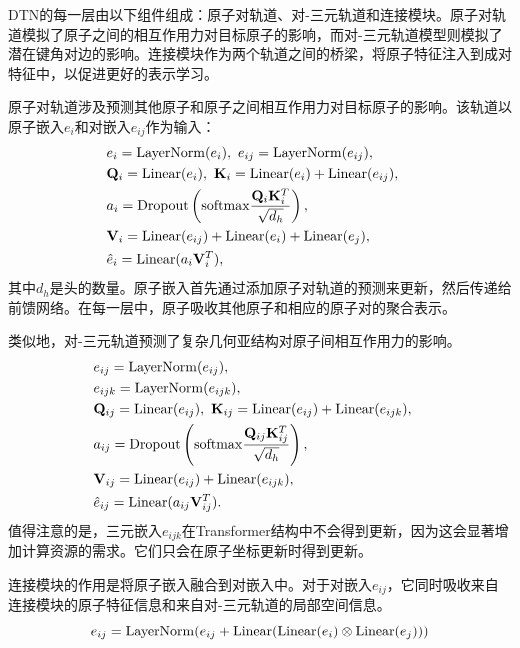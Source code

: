 DTN的每一层由以下组件组成：原子对轨道、对-三元轨道和连接模块。原子对轨道模拟了原子之间的相互作用力对目标原子的影响，而对-三元轨道模型则模拟了潜在键角对边的影响。连接模块作为两个轨道之间的桥梁，将原子特征注入到成对特征中，以促进更好的表示学习。

原子对轨道涉及预测其他原子和原子之间相互作用力对目标原子的影响。该轨道以原子嵌入$e_i$和对嵌入$e_{ij}$作为输入：
\begin{eqnarray}
    &e_i = {\rm LayerNorm}(e_i), \ e_{ij} = {\rm LayerNorm}(e_{ij}),& \\
    &\mathbf{Q}_i = {\rm Linear}(e_i), \ \mathbf{K}_i = {\rm Linear}(e_i) + {\rm Linear}(e_{ij}),& \\
    &a_i = {\rm Dropout} \left({\rm softmax} \frac{\mathbf{Q}_i \mathbf{K}_i^T}{\sqrt{d_h}} \right), & \\
    &\mathbf{V}_i = {\rm Linear}(e_{ij}) + {\rm Linear}(e_{i}) + {\rm Linear}(e_{j}),& \\
    &\hat{e}_i = {\rm Linear}(a_i \mathbf{V}_i^T),&
\end{eqnarray}
其中$d_h$是头的数量。原子嵌入首先通过添加原子对轨道的预测来更新，然后传递给前馈网络。在每一层中，原子吸收其他原子和相应的原子对的聚合表示。

类似地，对-三元轨道预测了复杂几何亚结构对原子间相互作用力的影响。
\begin{eqnarray}
    &e_{ij} = {\rm LayerNorm}(e_{ij}),&\\
    &e_{ijk} = {\rm LayerNorm}(e_{ijk}),&\\
    &\mathbf{Q}_{ij} = {\rm Linear}(e_{ij}), \ \mathbf{K}_{ij} = {\rm Linear}(e_{ij}) + {\rm Linear}(e_{ijk}),& \\
    &a_{ij}= {\rm Dropout} \left({\rm softmax} \frac{\mathbf{Q}_{ij} \mathbf{K}_{ij}^T}{\sqrt{d_h}} \right), & \\
    &\mathbf{V}_{ij} = {\rm Linear}(e_{ij}) + {\rm Linear}(e_{ijk}),& \\
    &\hat{e}_{ij} = {\rm Linear}(a_{ij} \mathbf{V}_{ij}^T).&
\end{eqnarray}
值得注意的是，三元嵌入$e_{ijk}$在Transformer结构中不会得到更新，因为这会显著增加计算资源的需求。它们只会在原子坐标更新时得到更新。

连接模块的作用是将原子嵌入融合到对嵌入中。对于对嵌入$e_{ij}$，它同时吸收来自连接模块的原子特征信息和来自对-三元轨道的局部空间信息。
\begin{equation}
    e_{ij} = {\rm LayerNorm}(e_{ij} + {\rm Linear}({\rm Linear}(e_i) \otimes {\rm Linear}(e_j)))
\end{equation}


